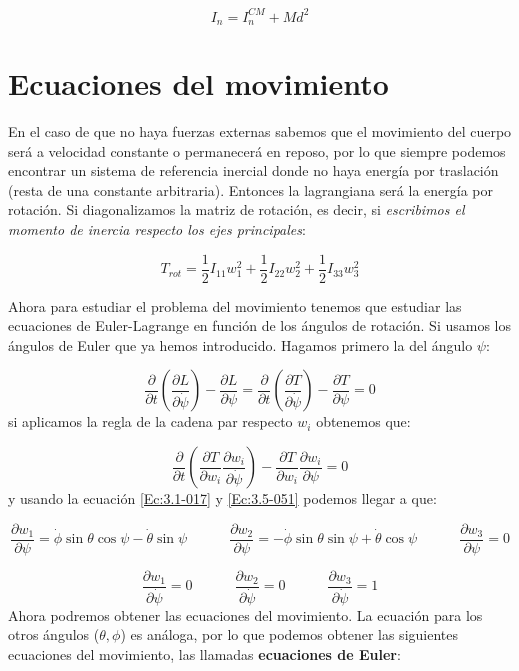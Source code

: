 \documentclass[12pt,a4paper]{book}
\newcommand{\parentesis}[1]{\left( #1  \right)}
\newcommand{\parciales}[2]{\frac{\partial #1}{\partial #2}}
\newcommand{\pparciales}[2]{\parentesis{\parciales{#1}{#2}}}
\newcommand{\tquad}{\quad \quad \quad}
\begin{document}
\begin{equation}
I_n = I_n^{CM} + M d^2
\end{equation}

\section{Ecuaciones del movimiento}

En el caso de que no haya fuerzas externas sabemos que el movimiento del cuerpo será a velocidad constante o permanecerá en reposo, por lo que siempre podemos encontrar un sistema de referencia inercial donde no haya energía por traslación (resta de una constante arbitraria). Entonces la lagrangiana será la energía por rotación. Si diagonalizamos la matriz de rotación, es decir, si \textit{escribimos el momento de inercia respecto los ejes principales}:

\begin{equation}
T_{rot} = \frac{1}{2} I_{11} w_1^2 + \frac{1}{2} I_{22} w_2^2 + \frac{1}{2} I_{33} w_3^2 \label{Ec:3.5-051}
\end{equation}

Ahora para estudiar el problema del movimiento tenemos que estudiar las ecuaciones de Euler-Lagrange en función de los ángulos de rotación. Si usamos los ángulos de Euler que ya hemos introducido. Hagamos primero la del ángulo $\psi$:

\begin{equation}
\parciales{}{t} \pparciales{L}{\dot{\psi}} - \parciales{L}{\psi} =  \parciales{}{t} \pparciales{T}{\dot{\psi}} - \parciales{T}{\psi}  = 0
\end{equation}
si aplicamos la regla de la cadena par respecto $w_i$ obtenemos que:

\begin{equation}
\parciales{}{t} \parentesis{\parciales{T}{w_i} \parciales{w_i}{\dot{\psi}}} - \parciales{T}{w_i} \parciales{w_i}{\psi} = 0 
\end{equation}
y usando la ecuación \ref{Ec:3.1-017} y \ref{Ec:3.5-051} podemos llegar a que:

\begin{equation}
\parciales{w_1}{\psi} = \dot{\phi} \sin \theta \cos \psi - \dot{\theta} \sin \psi \tquad \parciales{w_2}{\psi} = - \dot{\phi} \sin \theta \sin \psi + \dot{\theta} \cos \psi \tquad \parciales{w_3}{\psi} = 0
\end{equation}

\begin{equation}
\parciales{w_1}{\dot{\psi}} = 0 \tquad \parciales{w_2}{\dot{\psi}} = 0 \tquad \parciales{w_3}{\dot{\psi}} = 1
\end{equation}
Ahora podremos obtener las ecuaciones del movimiento. La ecuación para los otros ángulos ($\theta,\phi$) es análoga, por lo que podemos obtener las siguientes ecuaciones del movimiento, las llamadas \textbf{ecuaciones de Euler}:
\end{document}
